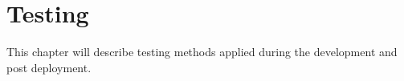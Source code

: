 
\chapter{Testing}\label{ch:testing}

This chapter will describe testing methods applied during the development and post deployment.




